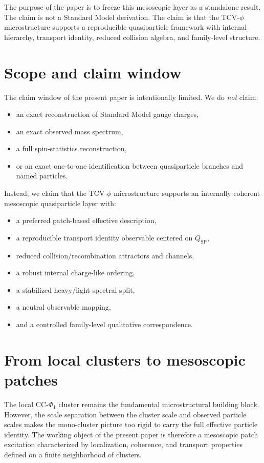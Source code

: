 \documentclass[aps,prd,onecolumn,nofootinbib,superscriptaddress]{revtex4-2}
\newcommand{\qsp}{\ensuremath{Q_{\mathrm{SP}}}}
\begin{document}
The purpose of the paper is to freeze this mesoscopic layer as a standalone result.
The claim is not a Standard Model derivation.
The claim is that the TCV-$\phi$ microstructure supports a reproducible quasiparticle framework with internal hierarchy, transport identity, reduced collision algebra, and family-level structure.

\section{Scope and claim window}
The claim window of the present paper is intentionally limited.
We do \emph{not} claim:
\begin{itemize}
  \item an exact reconstruction of Standard Model gauge charges,
  \item an exact observed mass spectrum,
  \item a full spin-statistics reconstruction,
  \item or an exact one-to-one identification between quasiparticle branches and named particles.
\end{itemize}
Instead, we claim that the TCV-$\phi$ microstructure supports an internally coherent mesoscopic quasiparticle layer with:
\begin{itemize}
  \item a preferred patch-based effective description,
  \item a reproducible transport identity observable centered on \qsp,
  \item reduced collision/recombination attractors and channels,
  \item a robust internal charge-like ordering,
  \item a stabilized heavy/light spectral split,
  \item a neutral observable mapping,
  \item and a controlled family-level qualitative correspondence.
\end{itemize}

\section{From local clusters to mesoscopic patches}
The local CC-$\Phi_1$ cluster remains the fundamental microstructural building block.
However, the scale separation between the cluster scale and observed particle scales makes the mono-cluster picture too rigid to carry the full effective particle identity.
The working object of the present paper is therefore a mesoscopic patch excitation characterized by localization, coherence, and transport properties defined on a finite neighborhood of clusters.
\end{document}
